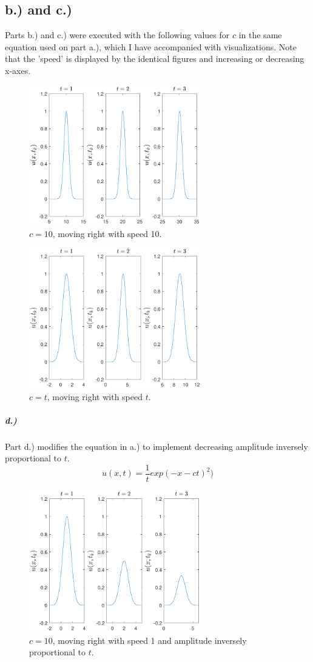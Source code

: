 \documentclass{article}
\begin{document}
\subsection*{b.) and c.)}
Parts b.) and c.) were executed with the following values for $c$ in the same equation used on part a.), which I have accompanied with visualizations. Note that the 'speed' is displayed by the identical figures and increasing or decreasing x-axes.
\begin{figure}[H]
\centering
    \includegraphics[width=75mm, scale=.8]{plot_1b.pdf}
	\caption{$c = 10$, moving right with speed 10.}
\end{figure}
\begin{figure}[H]
\centering
    \includegraphics[width=75mm, scale=.8]{plot_1c.pdf}
	\caption{$c = t$, moving right with speed $t$.}
\end{figure}
\subparagraph*{d.)} Part d.) modifies the equation in a.) to implement decreasing amplitude inversely proportional to $t$.
\begin{equation}
u(x,t) = \frac{1}{t}exp(-x - ct)^2) 
\end{equation}

\begin{figure}[H]
\centering
    \includegraphics[width=75mm, scale=.8]{plot_1d.pdf}
	\caption{$c = 10$, moving right with speed 1 and amplitude inversely proportional to $t$.}
\end{figure}
\end{document}
